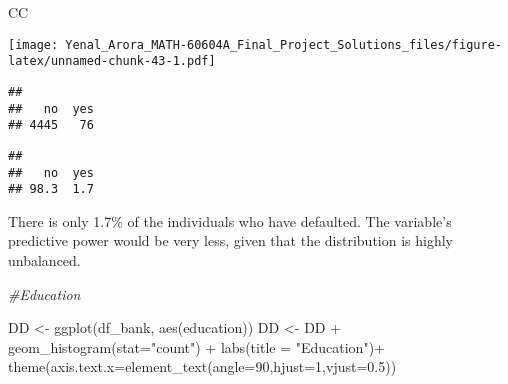 \documentclass[
]{article}
\newenvironment{Shaded}{\begin{snugshade}}{\end{snugshade}}
\newcommand{\AttributeTok}[1]{\textcolor[rgb]{0.77,0.63,0.00}{#1}}
\newcommand{\CommentTok}[1]{\textcolor[rgb]{0.56,0.35,0.01}{\textit{#1}}}
\newcommand{\DecValTok}[1]{\textcolor[rgb]{0.00,0.00,0.81}{#1}}
\newcommand{\FloatTok}[1]{\textcolor[rgb]{0.00,0.00,0.81}{#1}}
\newcommand{\FunctionTok}[1]{\textcolor[rgb]{0.00,0.00,0.00}{#1}}
\newcommand{\NormalTok}[1]{#1}
\newcommand{\OtherTok}[1]{\textcolor[rgb]{0.56,0.35,0.01}{#1}}
\newcommand{\SpecialCharTok}[1]{\textcolor[rgb]{0.00,0.00,0.00}{#1}}
\newcommand{\StringTok}[1]{\textcolor[rgb]{0.31,0.60,0.02}{#1}}
\begin{document}
\begin{Shaded}
\begin{Highlighting}[]
\NormalTok{CC}
\end{Highlighting}
\end{Shaded}

\texttt{[image: Yenal\_Arora\_MATH-60604A\_Final\_Project\_Solutions\_files/figure-latex/unnamed-chunk-43-1.pdf]}

\begin{Shaded}
\end{Shaded}

\begin{verbatim}
## 
##   no  yes 
## 4445   76
\end{verbatim}

\begin{Shaded}
\end{Shaded}

\begin{verbatim}
## 
##   no  yes 
## 98.3  1.7
\end{verbatim}

There is only 1.7\% of the individuals who have defaulted. The
variable's predictive power would be very less, given that the
distribution is highly unbalanced.

\begin{Shaded}
\begin{Highlighting}[]
\CommentTok{\#Education}

\NormalTok{DD }\OtherTok{\textless{}{-}} \FunctionTok{ggplot}\NormalTok{(df\_bank, }\FunctionTok{aes}\NormalTok{(education))}
\NormalTok{DD }\OtherTok{\textless{}{-}}\NormalTok{ DD }\SpecialCharTok{+} \FunctionTok{geom\_histogram}\NormalTok{(}\AttributeTok{stat=}\StringTok{"count"}\NormalTok{) }\SpecialCharTok{+} \FunctionTok{labs}\NormalTok{(}\AttributeTok{title =} \StringTok{"Education"}\NormalTok{)}\SpecialCharTok{+}
  \FunctionTok{theme}\NormalTok{(}\AttributeTok{axis.text.x=}\FunctionTok{element\_text}\NormalTok{(}\AttributeTok{angle=}\DecValTok{90}\NormalTok{,}\AttributeTok{hjust=}\DecValTok{1}\NormalTok{,}\AttributeTok{vjust=}\FloatTok{0.5}\NormalTok{))}
\end{Highlighting}
\end{Shaded}
\end{document}
